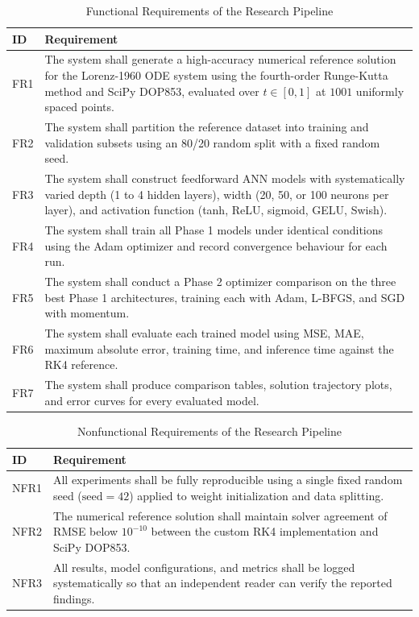\begin{table}[!ht]
\centering
\caption{Functional Requirements of the Research Pipeline}
\label{tab:fr}
\renewcommand{\arraystretch}{1.2}
\begin{tabular}{|p{1.2cm}|p{12.5cm}|}
\hline
\textbf{ID} & \textbf{Requirement} \\
\hline
FR1 & The system shall generate a high-accuracy numerical reference solution for the Lorenz-1960 ODE system using the fourth-order Runge-Kutta method and SciPy DOP853, evaluated over $t \in [0, 1]$ at $1001$ uniformly spaced points. \\
\hline
FR2 & The system shall partition the reference dataset into training and validation subsets using an 80/20 random split with a fixed random seed. \\
\hline
FR3 & The system shall construct feedforward ANN models with systematically varied depth (1 to 4 hidden layers), width (20, 50, or 100 neurons per layer), and activation function (tanh, ReLU, sigmoid, GELU, Swish). \\
\hline
FR4 & The system shall train all Phase 1 models under identical conditions using the Adam optimizer and record convergence behaviour for each run. \\
\hline
FR5 & The system shall conduct a Phase 2 optimizer comparison on the three best Phase 1 architectures, training each with Adam, L-BFGS, and SGD with momentum. \\
\hline
FR6 & The system shall evaluate each trained model using MSE, MAE, maximum absolute error, training time, and inference time against the RK4 reference. \\
\hline
FR7 & The system shall produce comparison tables, solution trajectory plots, and error curves for every evaluated model. \\
\hline
\end{tabular}
\end{table}

\begin{table}[!ht]
\centering
\caption{Nonfunctional Requirements of the Research Pipeline}
\label{tab:nfr}
\renewcommand{\arraystretch}{1.2}
\begin{tabular}{|p{1.5cm}|p{12.2cm}|}
\hline
\textbf{ID} & \textbf{Requirement} \\
\hline
NFR1 & All experiments shall be fully reproducible using a single fixed random seed ($\text{seed}=42$) applied to weight initialization and data splitting. \\
\hline
NFR2 & The numerical reference solution shall maintain solver agreement of RMSE below $10^{-10}$ between the custom RK4 implementation and SciPy DOP853. \\
\hline
NFR3 & All results, model configurations, and metrics shall be logged systematically so that an independent reader can verify the reported findings. \\
\hline
\end{tabular}
\end{table}

